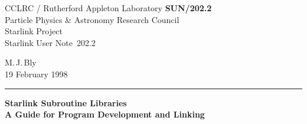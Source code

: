 \documentclass[twoside,11pt]{article}
\newcommand{\stardoccategory}  {Starlink User Note}
\newcommand{\stardocinitials}  {SUN}
\newcommand{\stardocnumber}    {202.2}
\newcommand{\stardocauthors}   {M.\,J.\,Bly}
\newcommand{\stardocdate}      {19 February 1998}
\newcommand{\stardoctitle}     {Starlink Subroutine Libraries \\[1.5ex]
                                A Guide for Program Development and Linking}
\newcommand{\stardocversion}   {software\_version}
\newcommand{\stardocmanual}    {manual\_type}
\newcommand{\stardocname}{\stardocinitials /\stardocnumber}
\newenvironment{latexonly}{}{}
\begin{document}
\thispagestyle{empty}

\begin{latexonly}
   CCLRC / {\sc Rutherford Appleton Laboratory} \hfill {\bf \stardocname}\\
   {\large Particle Physics \& Astronomy Research Council}\\
   {\large Starlink Project\\}
   {\large \stardoccategory\ \stardocnumber}
   \begin{flushright}
   \stardocauthors\\
   \stardocdate
   \end{flushright}
   \vspace{-4mm}
   \rule{\textwidth}{0.5mm}
   \vspace{5mm}
   \begin{center}
   {\Huge\bf  \stardoctitle \\ [2.5ex]}
   \end{center}
   \vspace{5mm}

\end{latexonly}
\end{document}
